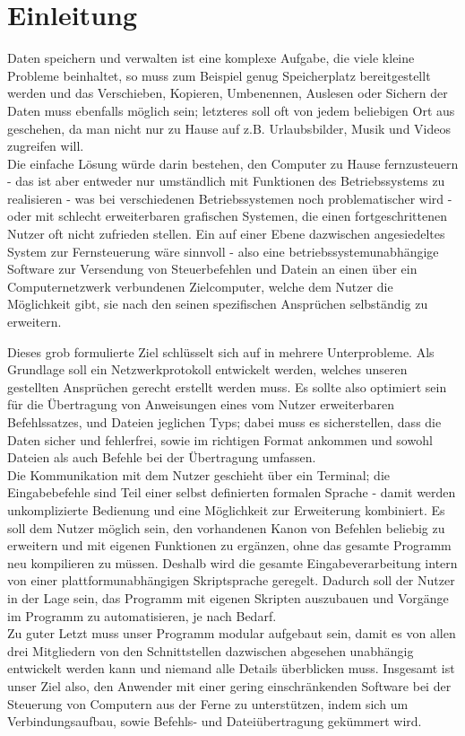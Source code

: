\documentclass[12pt,a4paper]{scrartcl}
\begin{document}
\section*{Einleitung}
Daten speichern und verwalten ist eine komplexe Aufgabe, die viele kleine Probleme beinhaltet, so muss zum Beispiel genug Speicherplatz bereitgestellt werden und das Verschieben, Kopieren, Umbenennen, Auslesen oder Sichern der Daten muss ebenfalls möglich sein; letzteres soll oft von jedem beliebigen Ort aus geschehen, da man nicht nur zu Hause auf z.B. Urlaubsbilder, Musik und Videos zugreifen will.\\
Die einfache Lösung würde darin bestehen, den Computer zu Hause fernzusteuern - das ist aber entweder nur umständlich mit Funktionen des Betriebssystems zu realisieren - was bei verschiedenen Betriebssystemen noch problematischer wird - oder mit schlecht erweiterbaren grafischen Systemen, die einen fortgeschrittenen Nutzer oft nicht zufrieden stellen.
Ein auf einer Ebene dazwischen angesiedeltes System zur Fernsteuerung wäre sinnvoll - also eine betriebssystemunabhängige Software zur Versendung von Steuerbefehlen und Datein an einen über ein Computernetzwerk verbundenen Zielcomputer, welche dem Nutzer die Möglichkeit gibt, sie nach den seinen spezifischen Ansprüchen selbständig zu erweitern.

Dieses grob formulierte Ziel schlüsselt sich auf in mehrere Unterprobleme. Als Grundlage soll ein Netzwerkprotokoll entwickelt werden, welches unseren gestellten Ansprüchen gerecht erstellt werden muss. 
Es sollte also optimiert sein für die Übertragung von Anweisungen eines vom Nutzer erweiterbaren Befehlssatzes, und Dateien jeglichen Typs; dabei muss es sicherstellen, dass die Daten sicher und fehlerfrei, sowie im richtigen Format ankommen und sowohl Dateien als auch Befehle bei der Übertragung umfassen.\\
Die Kommunikation mit dem Nutzer geschieht über ein Terminal; die Eingabebefehle sind Teil einer selbst definierten formalen Sprache - damit werden unkomplizierte Bedienung und eine Möglichkeit zur Erweiterung kombiniert.
Es soll dem Nutzer möglich sein, den vorhandenen Kanon von Befehlen beliebig zu erweitern und mit eigenen Funktionen zu ergänzen, ohne das gesamte Programm neu kompilieren zu müssen. Deshalb wird die gesamte Eingabeverarbeitung intern von einer plattformunabhängigen Skriptsprache geregelt.
Dadurch soll der Nutzer in der Lage sein, das Programm mit eigenen Skripten auszubauen und Vorgänge im Programm zu automatisieren, je nach Bedarf.\\
Zu guter Letzt muss unser Programm modular aufgebaut sein, damit es von allen drei Mitgliedern von den Schnittstellen dazwischen abgesehen unabhängig entwickelt werden kann und niemand alle Details überblicken muss.
Insgesamt ist unser Ziel also, den Anwender mit einer gering einschränkenden Software bei der Steuerung von Computern aus der Ferne zu unterstützen, indem sich um Verbindungsaufbau, sowie Befehls- und Dateiübertragung gekümmert wird.
\end{document}
